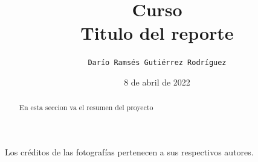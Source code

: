 \documentclass[letterpaper,12pt]{article} %
\newcommand{\myMateria}{Curso}
\newcommand{\MyReport}{Titulo del reporte}
\newcommand{\myDate}{8 de abril de 2022}
\newcommand{\myName}{Darío Ramsés Gutiérrez Rodríguez}
\begin{document}
    
    \newpage
    \tableofcontents
    \newpage

\title{\myMateria \\\textbf{\MyReport} \\ } 

\author{ \normalsize{\texttt{\myName}} }
\date{\myDate}
\maketitle
\thispagestyle{fancy}

\begin{abstract}
En esta seccion va el resumen del proyecto
\end{abstract}




\nocite{*}




\centering \small Los créditos de las fotografías pertenecen a sus respectivos autores.

\centering\vspace*{\fill} 
\end{document}
